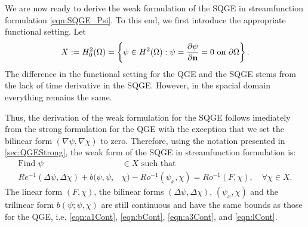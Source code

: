 We are now ready to derive the weak formulation of the SQGE in streamfunction
formulation \eqref{eqn:SQGE_Psi}. To this end, we first introduce the
appropriate functional setting. Let
\begin{equation*}
  X := H^2_0(\Omega) = \left\{ \psi\in H^2(\Omega): \psi=\frac{\partial\psi}{\partial {\bf n}}=0
    \text{ on } \partial\Omega \right\} .
\end{equation*}
The difference in the functional setting for the QGE and the SQGE stems from the
lack of time derivative in the SQGE. However, in the spacial domain everything
remains the same.

Thus, the derivation of the weak formulation for the SQGE follows imediately
from the strong formulation for the QGE with the exception that we set the
bilinear form $(\nabla \psi, \nabla \chi)$ to zero. Therefore, using the
notation presented in \autoref{sec:QGEStrong}, the weak form of the SQGE in streamfunction
formulation is:
\begin{equation}
  \begin{split}
    \text{Find }\psi &\in X \text{ such that} \\
    Re^{-1} (\Delta \psi, \Delta \chi) + b(\psi,\psi,&\chi) - Ro^{-1} (\psi_x,\chi) =
      Ro^{-1} (F,\chi),\quad \forall \chi \in X.  \end{split} \label{eqn:SQGEWF}
\end{equation}
The linear form $(F, \chi)$, the bilinear forms $(\Delta \psi, \Delta \chi)$,
$(\psi_x, \chi)$ and the trilinear form $b(\psi;\psi,\chi)$ are still continuous
\cite{Cayco86} and have the same bounds as those for the QGE, i.e.
\eqref{eqn:a1Cont}, \eqref{eqn:bCont}, \eqref{eqn:a3Cont}, and
\eqref{eqn:lCont}.

